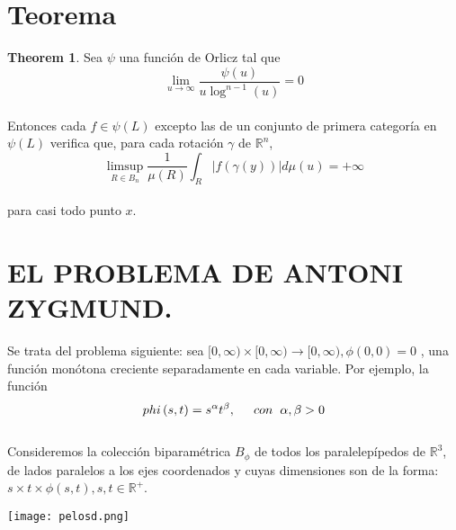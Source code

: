 \documentclass{article}
\theoremstyle{definition}
\newtheorem{theorem}{Theorem}[section]
\begin{document}
\section{Teorema}
\begin{theorem}
Sea $\psi$ una función de Orlicz tal que
\[\lim_{u \to \infty } \frac{\psi\left( u \right)}{u\log^{n-1}\left( u \right)} =0 \]\\
Entonces cada $f\in \psi(L)$ excepto las de un conjunto de primera categoría en $\psi(L)$ verifica que, para cada rotación $\gamma$ de $\mathbb{R}^n$,
\[\limsup_{R \in B_n}\frac{1}{\mu(R)}\int_{R}^{}\left| f\left( \gamma\left( y \right) \right) \right|d\mu\left( u \right)= +\infty  \]\\
para casi todo punto $x$.
\end{theorem}
\section {\normalsize EL PROBLEMA DE ANTONI ZYGMUND.}

Se trata del problema siguiente: sea $[0, \infty)×[0,\infty) \to [0,\infty), \phi (0,0) = 0$
, una función monótona creciente separadamente en cada variable. Por ejemplo, la función
\[\\phi\left( s,t \right)=s^\alpha t^\beta, \hspace{0.5cm} con \hspace{0.2cm}\alpha,\beta>0\]\\
Consideremos la colección biparamétrica $B_\phi$ de todos los paralelepípedos de $\mathbb{R}^3$, de lados paralelos a los ejes coordenados y cuyas dimensiones son de la forma: $s\times t \times \phi(s,t), s,t\in \mathbb{R}^+ $.\\
\begin{center}
    \texttt{[image: pelosd.png]}
\end{center}
\end{document}
